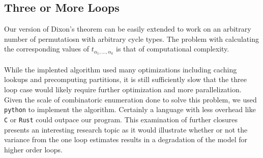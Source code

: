 \subsection{Three or More Loops}
Our version of Dixon's theorem can be easily extended to work on an arbitrary number of permutatiosn with arbitrary cycle types. The problem with calculating the corresponding values of $t_{\alpha_1,\dots,\alpha_k}$ is that of computational complexity. 
\\\\While the implented algorithm used many optimizations including caching lookups and precomputing partitions, it is still sufficiently slow that the three loop case would likely require further optimization and more parallelization. Given the scale of combinatoric enumeration done to solve this problem, we used \texttt{python} to implement the algorithm. Certainly a language with less overhead like \texttt{C} or \texttt{Rust} could outpace our program. This examination of further closures presents an interesting research topic as it would illustrate whether or not the variance from the one loop estimates results in a degradation of the model for higher order loops.  
